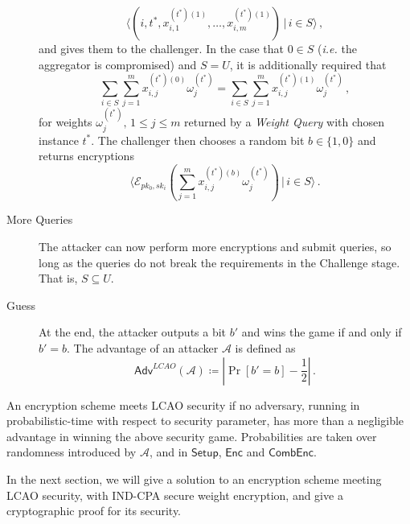 \documentclass[twocolumn]{autart}
\begin{document}
\begin{description}
\begin{equation*}
        \langle(i,t^*,x^{(t^*)(1)}_{i,1},\dots,x^{(t^*)(1)}_{i,m})\,|\, i \in S\rangle\,,
    \end{equation*}
    and gives them to the challenger. In the case that $0 \in S$ (\textit{i.e.} the aggregator is compromised) and $S = U$, it is additionally required that
    \begin{equation*}
        \sum_{i\in S}\sum^{m}_{j=1} x^{(t^*)(0)}_{i,j}\omega^{(t^*)}_j = \sum_{i \in S}\sum^{m}_{j=1} x^{(t^*)(1)}_{i,j}\omega^{(t^*)}_j\,,
    \end{equation*}
    for weights $\omega^{(t^*)}_j,\,1\leq j \leq m$ returned by a \textit{Weight Query} with chosen instance $t^*$. The challenger then chooses a random bit $b \in \{1,0\}$ and returns encryptions 
    \begin{equation*}
        \langle\mathcal{E}_{pk_0,sk_i}(\sum^m_{j=1}x^{(t^*)(b)}_{i,j}\omega^{(t^*)}_j)\,|\,i\in S\rangle\,.
    \end{equation*}
    \item[More Queries] The attacker can now perform more encryptions and submit queries, so long as the queries do not break the requirements in the Challenge stage. That is, $S \subseteq U$.
    \item[Guess] At the end, the attacker outputs a bit $b'$ and wins the game if and only if $b' = b$. The advantage of an attacker $\mathcal{A}$ is defined as
    \begin{equation*}
        \mathsf{Adv}^{LCAO}(\mathcal{A}) \coloneqq \left\lvert \Pr [b'=b] - \frac{1}{2}\right\rvert\,.
    \end{equation*} 
\end{description}

\begin{defn}
    An encryption scheme meets LCAO security if no adversary, running in probabilistic-time with respect to security parameter, has more than a negligible advantage in winning the above security game. Probabilities are taken over randomness introduced by $\mathcal{A}$, and in $\mathsf{Setup}$, $\mathsf{Enc}$ and $\mathsf{CombEnc}$.
\end{defn}

In the next section, we will give a solution to an encryption scheme meeting LCAO security, with IND-CPA secure weight encryption, and give a cryptographic proof for its security.

% 
% 
\end{document}
